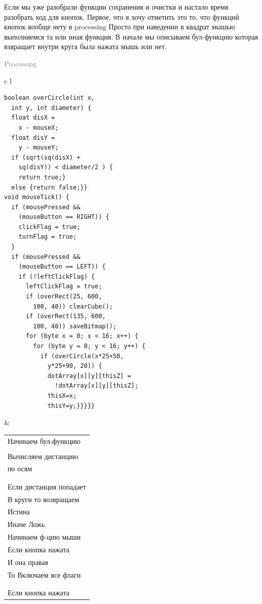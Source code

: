 \documentclass[a4paper, 12pt]{article}
\begin{document}
Если мы уже разобрали функции сохранения и очистки и настало время разобрать
код для кнопок. Первое, что я хочу отметить это то, что функций кнопок вообще 
нету в processing Просто при наведении в квадрат мышью выполняемся та или иная 
функция. В начале мы описываем бул-функцию которая взвращает внутри круга была 
нажата мышь или нет.

\begin{flushright}\begin{huge}\textcolor{grey}{Processing}\end{huge}\end{flushright}
\begin{tabular}{c l}
\hline
\begin{lstlisting}[style=pmyLatexStyle]
boolean overCircle(int x, 
  int y, int diameter) {
  float disX = 
    x - mouseX;
  float disY = 
    y - mouseY;
  if (sqrt(sq(disX) + 
    sq(disY)) < diameter/2 ) {
    return true;} 
  else {return false;}}
void mouseTick() {
  if (mousePressed && 
    (mouseButton == RIGHT)) {
    clickFlag = true;
    turnFlag = true;
  }
  if (mousePressed && 
    (mouseButton == LEFT)) {
    if (!leftClickFlag) {
      leftClickFlag = true;
      if (overRect(25, 600,
        100, 40)) clearCube();
      if (overRect(135, 600,
        100, 40)) saveBitmap();
      for (byte x = 0; x < 16; x++) {
        for (byte y = 0; y < 16; y++) {
          if (overCircle(x*25+50,
            y*25+90, 20)) {
            dotArray[x][y][thisZ] = 
              !dotArray[x][y][thisZ];
            thisX=x;
            thisY=y;}}}}}
\end{lstlisting}
&
\begin{tabular}{l}
Начинаем бул-функцию\\
\\
Вычисляем дистанцию\\ 
по осям\\
\\
\\
Если дистанция попадает\\
В круги то возвращаем\\
Истина \\
Иначе Ложь\\
Начинаем ф-цию мыши\\
Если кнопка нажата\\
И она правая\\
То Включаем все флаги\\
\\
\\
Если кнопка нажата\\

\end{tabular}
\end{tabular}
\end{document}
